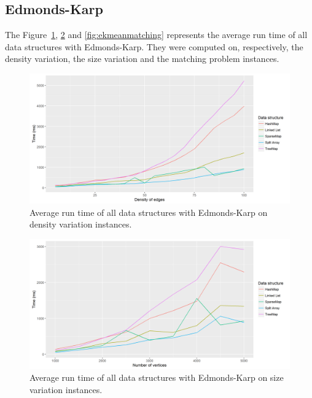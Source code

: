 \subsection{Edmonds-Karp}
The Figure~\ref{fig:ekmeandensity}, \ref{fig:ekmeansize} and \ref{fig:ekmeanmatching} represents the average run time of all data structures with Edmonds-Karp. They were computed on, respectively, the density variation, the size variation and the matching problem instances.
\begin{figure}[H]
\begin{center}
\includegraphics[scale=0.54]{images/results/ekmeandensity.png}
\caption{Average run time of all data structures with Edmonds-Karp on density variation instances.}
\label{fig:ekmeandensity}
\end{center}
\end{figure}
\begin{figure}[H]
\begin{center}
\includegraphics[scale=0.54]{images/results/ekmeansize.png}
\caption{Average run time of all data structures with Edmonds-Karp on size variation instances.}
\label{fig:ekmeansize}
\end{center}
\end{figure}
